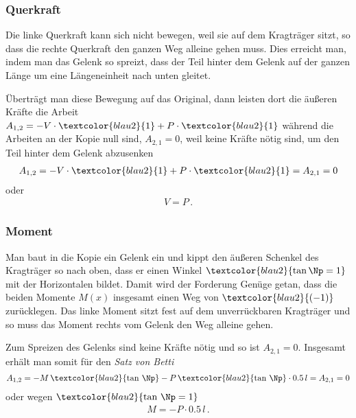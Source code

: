 \subsubsection*{Querkraft}
Die linke Querkraft kann sich nicht bewegen, weil sie auf dem Kragtr\"{a}ger sitzt, so dass die rechte Querkraft den ganzen Weg alleine gehen muss. Dies erreicht man, indem man das Gelenk so spreizt, dass
der Teil hinter dem Gelenk auf der ganzen L\"{a}nge um eine L\"{a}ngeneinheit nach unten gleitet.

\"{U}bertr\"{a}gt man diese Bewegung auf das Original, dann leisten dort die \"{a}u{\ss}eren Kr\"{a}fte die Arbeit $A_{1,2} = - V\cdot \textcolor{blau2}{1} + P \cdot \textcolor{blau2}{1}$ w\"{a}hrend
die Arbeiten an der Kopie null sind, $A_{2,1} = 0$, weil keine Kr\"{a}fte n\"{o}tig sind, um den Teil hinter dem Gelenk abzusenken
\begin{align}
A_{1,2} = - V\cdot \textcolor{blau2}{1} + P \cdot \textcolor{blau2}{1} = A_{2,1} = 0
\end{align}
 oder
\begin{align}
V = P\,.
\end{align}
\subsubsection*{Moment}
Man baut in die Kopie ein Gelenk ein und kippt den \"{a}u{\ss}eren Schenkel des Kragtr\"{a}ger so nach oben, dass er einen Winkel $\textcolor{blau2}{\tan \Np = 1} $ mit der Horizontalen bildet. Damit wird der Forderung Gen\"{u}ge getan, dass die beiden Momente $M(x)$ insgesamt einen Weg von $\textcolor{blau2}{(-1)}$ zur\"{u}cklegen. Das linke Moment sitzt fest auf dem unverr\"{u}ckbaren Kragtr\"{a}ger und so muss das Moment rechts vom Gelenk den Weg alleine gehen.

Zum Spreizen des Gelenks sind keine Kr\"{a}fte n\"{o}tig und so ist $A_{2,1} = 0$. Insgesamt erh\"{a}lt man somit f\"{u}r den {\em Satz von Betti\/}
\begin{align}
A_{1,2} = - M\,\textcolor{blau2}{\tan\,\Np} - P\,\textcolor{blau2}{\tan\,\Np} \cdot 0.5\,l = A_{2,1} = 0
\end{align}
oder wegen $\textcolor{blau2}{\tan\,\Np = 1}$
\begin{align}
M = - P \cdot 0.5\,l\,.
\end{align}
